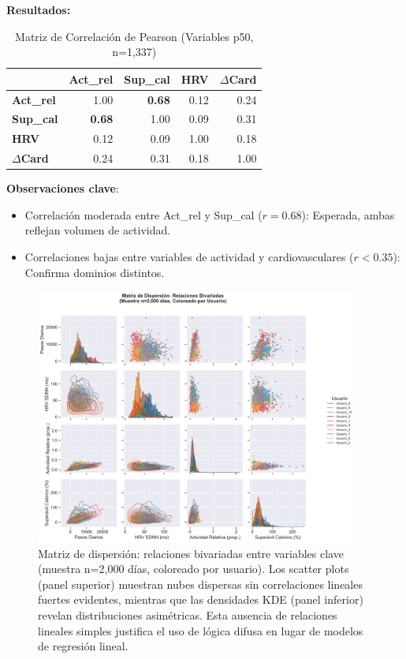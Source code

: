 \documentclass[12pt,letterpaper,twoside]{report}
\begin{document}
\begin{calculobox}
\begin{calculobox}
\textbf{Resultados:}

\begin{table}[H]
\centering
\caption{Matriz de Correlación de Pearson (Variables p50, n=1,337)}
\label{tab:correlation_matrix}
\begin{tabular}{@{}lrrrr@{}}
\toprule
 & \textbf{Act\_rel} & \textbf{Sup\_cal} & \textbf{HRV} & \textbf{$\Delta$Card} \\
\midrule
\textbf{Act\_rel}     & 1.00 & \textbf{0.68} & 0.12 & 0.24 \\
\textbf{Sup\_cal}     & \textbf{0.68} & 1.00 & 0.09 & 0.31 \\
\textbf{HRV}          & 0.12 & 0.09 & 1.00 & 0.18 \\
\textbf{$\Delta$Card} & 0.24 & 0.31 & 0.18 & 1.00 \\
\bottomrule
\end{tabular}
\end{table}

\textbf{Observaciones clave}:
\begin{itemize}[noitemsep]
    \item Correlación moderada entre Act\_rel y Sup\_cal ($r=0.68$): Esperada, ambas reflejan volumen de actividad.
    \item Correlaciones bajas entre variables de actividad y cardiovasculares ($r < 0.35$): Confirma dominios distintos.
\end{itemize}
\end{calculobox}

\begin{figure}[htbp]
\centering
\includegraphics[width=0.95\textwidth]{../analisis_u/descriptivos_visuales/scatter_matrix_relaciones.png}
\caption{Matriz de dispersión: relaciones bivariadas entre variables clave (muestra n=2,000 días, coloreado por usuario). Los scatter plots (panel superior) muestran nubes dispersas sin correlaciones lineales fuertes evidentes, mientras que las densidades KDE (panel inferior) revelan distribuciones asimétricas. Esta ausencia de relaciones lineales simples justifica el uso de lógica difusa en lugar de modelos de regresión lineal.}
\label{fig:scatter_matrix}
\end{figure}


\end{calculobox}
\end{document}
